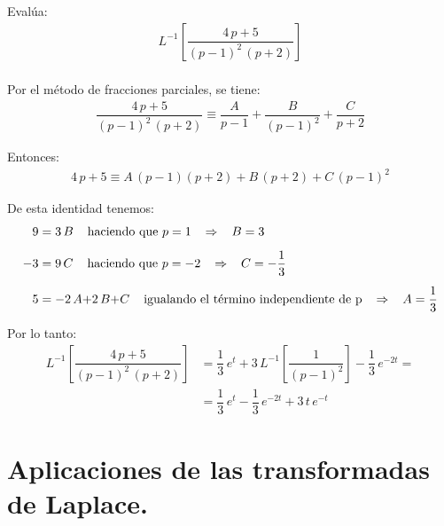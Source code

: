 \begin{ejemplo}
Evalúa:
\begin{align*}
L^{-1} \left[ \dfrac{4 \, p + 5}{(p - 1)^{2} \, (p + 2)} \right]
\end{align*}
\\[0.5em]
Por el método de fracciones parciales, se tiene:
\begin{align*}
\dfrac{4 \, p + 5}{(p - 1)^{2} \, (p + 2)} \equiv \dfrac{A}{p - 1} + \dfrac{B}{(p - 1)^{2}} + \dfrac{C}{p + 2}
\end{align*}

Entonces:
\begin{align*}
4 \, p + 5 \equiv A \, (p - 1)(p + 2) + B \, (p + 2) + C \, (p - 1)^{2}
\end{align*}

De esta identidad tenemos:
\begin{align*}
9 &= 3 \, B \hspace{0.4cm} \mbox{haciendo que } p = 1 \hspace{0.3cm} \Rightarrow \hspace{0.3cm} B = 3 \\[0.5em]
- 3 &= 9 \, C \hspace{0.4cm} \mbox{haciendo que } p = -2 \hspace{0.3cm} \Rightarrow \hspace{0.3cm} C = -\dfrac{1}{3} \\[0.5em]
5 &= -2 \, A {+}  2 \, B {+} C \hspace{0.4cm} \mbox{igualando el término independiente de p} \hspace{0.3cm} \Rightarrow \hspace{0.3cm} A = \dfrac{1}{3}
\end{align*}

Por lo tanto:
\begin{align*}
L^{-1} \left[ \dfrac{4 \, p + 5}{(p - 1)^{2} \, (p + 2)} \right] &= \dfrac{1}{3} \, e^{t} +  3 \, L^{-1} \left[\dfrac{1}{(p - 1)^{2}} \right] - \dfrac{1}{3} \, e^{-2 t} = \\[0.5em]
&= \dfrac{1}{3} \, e^{t} - \dfrac{1}{3} \, e^{- 2 t} + 3 \, t \, e^{-t}
\end{align*}
\end{ejemplo}

\section{Aplicaciones de las transformadas de Laplace.}

